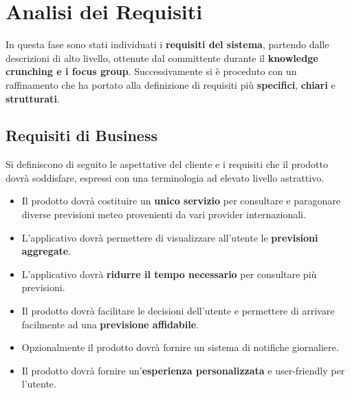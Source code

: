 

\chapter{Analisi dei Requisiti}
In questa fase sono stati individuati i \textbf{requisiti del sistema}, partendo dalle descrizioni di alto livello, ottenute dal committente durante il \textbf{knowledge crunching e i focus group}. Successivamente si è proceduto con un raffinamento che ha portato alla definizione di requisiti più \textbf{specifici}, \textbf{chiari} e \textbf{strutturati}.
	
	\section{Requisiti di Business}
	Si definiscono di seguito le aspettative del cliente e i requisiti che il prodotto dovrà soddisfare, espressi con una terminologia ad elevato livello astrattivo.
        \begin{itemize}
        \item Il prodotto dovrà costituire un \textbf{unico servizio} per consultare e paragonare diverse previsioni meteo provenienti da vari provider internazionali.
        \item L'applicativo dovrà permettere di visualizzare all'utente le \textbf{previsioni aggregate}. 
            \item L'applicativo dovrà \textbf{ridurre il tempo necessario} per consultare più previsioni.
            \item Il prodotto dovrà facilitare le decisioni dell'utente e permettere di arrivare facilmente ad una \textbf{previsione affidabile}. 
            \item Opzionalmente il prodotto dovrà fornire un sistema di notifiche giornaliere. 
            \item Il prodotto dovrà fornire un'\textbf{esperienza personalizzata} e user-friendly per l'utente.
        \end{itemize}
	
